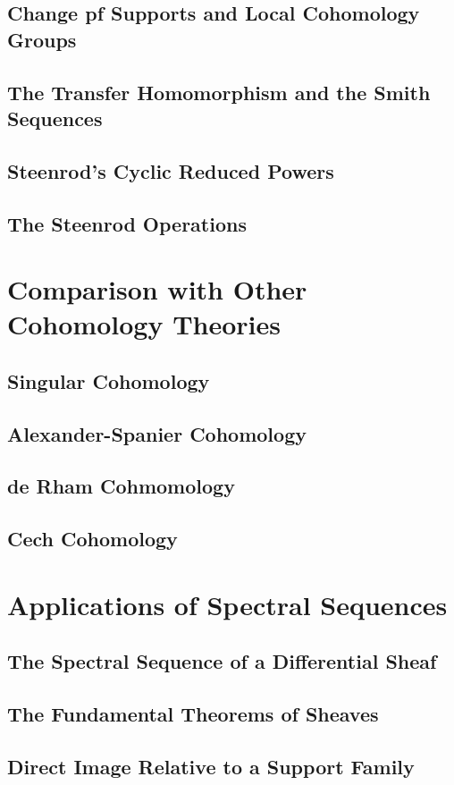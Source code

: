 \subsection{Change pf Supports and Local Cohomology Groups}
\subsection{The Transfer Homomorphism and the Smith Sequences}
\subsection{Steenrod's Cyclic Reduced Powers}
\subsection{The Steenrod Operations}

\section{Comparison with Other Cohomology Theories}
\subsection{Singular Cohomology}
\subsection{Alexander-Spanier Cohomology}
\subsection{de Rham Cohmomology}
\subsection{Cech Cohomology}

\section{Applications of Spectral Sequences}
\subsection{The Spectral Sequence of a Differential Sheaf}
\subsection{The Fundamental Theorems of Sheaves}
\subsection{Direct Image Relative to a Support Family}
